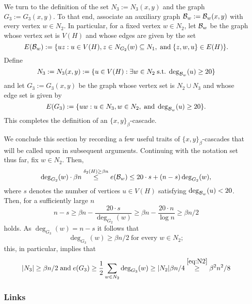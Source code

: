\documentclass[11pt,reqno]{amsart}
\begin{document}

We turn to the definition of the set $N_3 := N_3(x,y)$ and the graph $G_3 := G_3(x,y)$. To that end, associate an auxiliary graph $\mathcal{B}_w:= \mathcal{B}_w(x,y)$ with every vertex $w \in N_2$. In particular, for a fixed vertex $w \in N_2$, let $\mathcal{B}_w$ be the graph whose vertex set is $V(H)$ and whose edges are given by the set
$$
E(\mathcal{B}_w) := \{uz: u \in V(H), z \in N_{G_2}(w) \subseteq N_1,\; \text{and}\; \{z,w,u\} \in E(H)\}.
$$ 
Define 
$$
N_3:= N_3(x,y) := \{u \in V(H): \exists w \in N_2 \; \text{s.t.} \; \deg_{\mathcal{B}_w}(u) \geq 20\}
$$
and let $G_3:= G_3(x,y)$ be the graph whose vertex set is $N_2 \cup N_3$ and whose edge set is given by 
$$
E(G_3) := \{u w: u \in N_3, w \in N_2, \; \text{and} \; \deg_{\mathcal{B}_w}(u) \geq 20\}.
$$
This completes the definition of an $\{x,y\}_\beta$-cascade. 
\vspace{1em}

We conclude this section by recording a few useful traits of $\{x,y\}_\beta$-cascades that will be called upon in subsequent arguments. Continuing with the notation set thus far, fix $w \in N_2$. Then, 
$$
\deg_{G_2}(w) \cdot \beta n \overset{\delta_2(H) \geq \beta n}{\leq} e(\mathcal{B}_w) \leq 20 \cdot s + (n-s) \deg_{G_2}(w),
$$
where $s$ denotes the number of vertices $u \in V(H)$ satisfying $\deg_{\mathcal{B}_w}(u) < 20$. Then, for a sufficiently large  $n$
$$
n-s \geq \beta n - \frac{20 \cdot s}{\deg_{G_2}(w)} \geq \beta n - \frac{20 \cdot n}{\log n} \geq \beta n /2
$$
holds. As $\deg_{G_3}(w) = n-s$ it follows that 
\begin{equation}\label{eq:G3N2deg}
\deg_{G_3}(w) \geq \beta n / 2 \; \text{for every $w \in N_2$};
\end{equation}
this, in particular, implies that
\begin{equation}\label{eq:G3N3}
|N_3| \geq \beta n / 2 \; \text{and} \; e(G_3) \geq \frac{1}{2} \sum_{w \in N_2} \deg_{G_3}(w) \geq |N_2| \beta n / 4 \overset{\eqref{eq:N2}}{\geq} \beta^2 n ^2 /8
\end{equation}



\subsubsection{Links}
\end{document}

